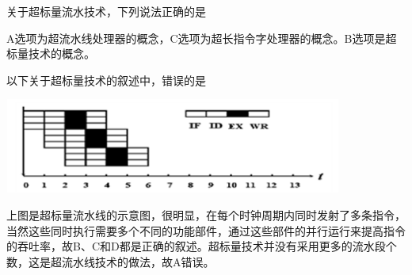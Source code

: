 \question 关于超标量流水技术，下列说法正确的是
\par{}
\begin{solution}A选项为超流水线处理器的概念，C选项为超长指令字处理器的概念。B选项是超标量技术的概念。
\end{solution}
\question 以下关于超标量技术的叙述中，错误的是
\par{}
\begin{solution}\includegraphics[width=4.37500in,height=1.22917in]{computerassets/bb2f406e57cb9867c61ecb280bd597b7.png}~

上图是超标量流水线的示意图，很明显，在每个时钟周期内同时发射了多条指令，当然这些同时执行需要多个不同的功能部件，通过这些部件的并行运行来提高指令的吞吐率，故B、C和D都是正确的叙述。超标量技术并没有采用更多的流水段个数，这是超流水线技术的做法，故A错误。
\end{solution}
